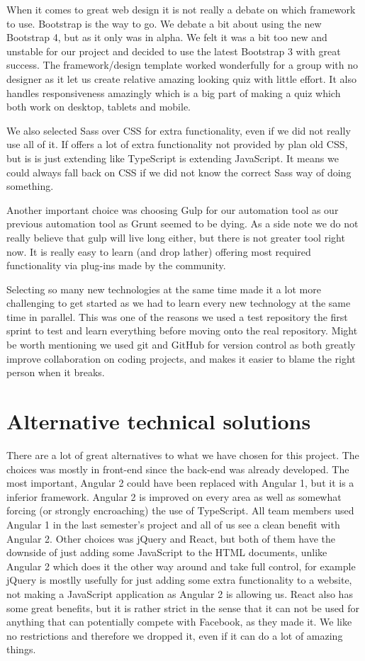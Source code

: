 When it comes to great web design it is not really a debate on which framework to use. Bootstrap is the way to go. We debate a bit about using the new Bootstrap 4, but as it only was in alpha. We felt it was a bit too new and unstable for our project and decided to use the latest Bootstrap 3 with great success. The framework/design template worked wonderfully for a group with no designer as it let us create relative amazing looking quiz with little effort. It also handles responsiveness amazingly which is a big part of making a quiz which both work on desktop, tablets and mobile.

We also selected Sass\cite{Sass:14:online} over CSS for extra functionality, even if we did not really use all of it. If offers a lot of extra functionality not provided by plan old CSS, but is is just extending like TypeScript is extending JavaScript. It means we could always fall back on CSS if we did not know the correct Sass way of doing something. 

Another important choice was choosing Gulp for our automation tool as our previous automation tool as Grunt seemed to be dying. As a side note we do not really believe that gulp will live long either, but there is not greater tool right now. It is really easy to learn (and drop lather) offering most required functionality via plug-ins made by the community.

Selecting so many new technologies at the same time made it a lot more challenging to get started as we had to learn every new technology at the same time in parallel. This was one of the reasons we used a test repository the first sprint to test and learn everything before moving onto the real repository. Might be worth mentioning we used git and GitHub for version control as both greatly improve collaboration on coding projects, and makes it easier to blame the right person when it breaks.

\section{Alternative technical solutions}
\label{sec:alttec}

There are a lot of great alternatives to what we have chosen for this project. The choices was mostly in front-end since the back-end was already developed. The most important, Angular 2 could have been replaced with Angular 1, but it is a inferior framework. Angular 2 is improved on every area as well as somewhat forcing (or strongly encroaching) the use of TypeScript. All team members used Angular 1 in the last semester's project and all of us see a clean benefit with Angular 2. Other choices was jQuery and React, but both of them have the downside of just adding some JavaScript to the HTML documents, unlike Angular 2 which does it the other way around and take full control, for example jQuery is mostlly usefully for just adding some extra functionality to a website, not making a JavaScript application as Angular 2 is allowing us. React also has some great benefits, but it is rather strict in the sense that it can not be used for anything that can potentially compete  with Facebook, as they made it. We like no restrictions and therefore we dropped it, even if it can do a lot of amazing things.

